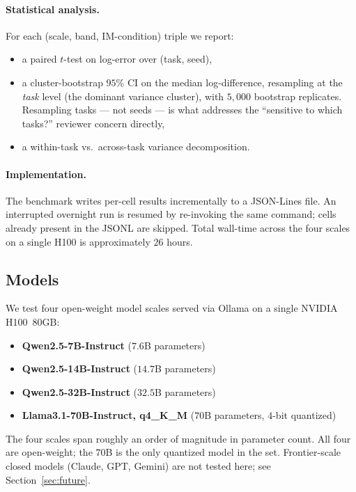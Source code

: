 \documentclass[11pt]{article}
\begin{document}
\paragraph{Statistical analysis.}  For each (scale, band,
IM-condition) triple we report:
\begin{itemize}[leftmargin=2em,itemsep=0pt,topsep=2pt]
\item a paired $t$-test on log-error over (task, seed),
\item a cluster-bootstrap $95\%$ CI on the median log-difference,
  resampling at the \emph{task} level (the dominant variance
  cluster), with $5{,}000$ bootstrap replicates.  Resampling tasks
  --- not seeds --- is what addresses the
  ``sensitive to which tasks?'' reviewer concern directly,
\item a within-task vs.\ across-task variance decomposition.
\end{itemize}

\paragraph{Implementation.}  The benchmark writes per-cell results
incrementally to a JSON-Lines file.  An interrupted overnight run
is resumed by re-invoking the same command; cells already present
in the JSONL are skipped.  Total wall-time across the four scales
on a single H100 is approximately $26$ hours.

\subsection{Models}
\label{sec:models}

We test four open-weight model scales served via Ollama on a
single NVIDIA H100~80GB:
\begin{itemize}[leftmargin=2em,itemsep=0pt,topsep=2pt]
\item \textbf{Qwen2.5-7B-Instruct} ($7.6$B parameters)
\item \textbf{Qwen2.5-14B-Instruct} ($14.7$B parameters)
\item \textbf{Qwen2.5-32B-Instruct} ($32.5$B parameters)
\item \textbf{Llama3.1-70B-Instruct, q4\_K\_M} ($70$B parameters,
  $4$-bit quantized)
\end{itemize}
The four scales span roughly an order of magnitude in parameter
count.  All four are open-weight; the $70$B is the only quantized
model in the set.  Frontier-scale closed models (Claude, GPT,
Gemini) are not tested here; see Section~\ref{sec:future}.
\end{document}
